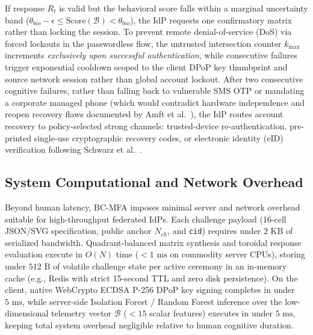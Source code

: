If response $R_t$ is valid but the behavioral score falls within a marginal uncertainty band ($\theta_{bio} - \epsilon \le \text{Score}(\mathcal{B}) < \theta_{bio}$), the IdP requests one confirmatory matrix rather than locking the session. To prevent remote denial-of-service (DoS) via forced lockouts in the passwordless flow, the untrusted intersection counter $k_{\max}$ increments \emph{exclusively upon successful authentication}, while consecutive failures trigger exponential cooldown scoped to the client DPoP key thumbprint and source network session rather than global account lockout. After two consecutive cognitive failures, rather than falling back to vulnerable SMS OTP or mandating a corporate managed phone (which would contradict hardware independence and reopen recovery flaws documented by Amft et al.~\cite{amft2023weve}), the IdP routes account recovery to policy-selected strong channels: trusted-device re-authentication, pre-printed single-use cryptographic recovery codes, or electronic identity (eID) verification following Schwarz et al.~\cite{schwarz2022feido}.

\subsection{System Computational and Network Overhead}
Beyond human latency, BC-MFA imposes minimal server and network overhead suitable for high-throughput federated IdPs. Each challenge payload (16-cell JSON/SVG specification, public anchor $N_{ch}$, and \texttt{cid}) requires under $2\text{ KB}$ of serialized bandwidth. Quadrant-balanced matrix synthesis and toroidal response evaluation execute in $O(N)$ time ($< 1\text{ ms}$ on commodity server CPUs), storing under $512\text{ B}$ of volatile challenge state per active ceremony in an in-memory cache (e.g., Redis with strict 15-second TTL and zero disk persistence). On the client, native WebCrypto ECDSA P-256 DPoP key signing completes in under $5\text{ ms}$, while server-side Isolation Forest / Random Forest inference over the low-dimensional telemetry vector $\mathcal{B}$ ($< 15$ scalar features) executes in under $5\text{ ms}$, keeping total system overhead negligible relative to human cognitive duration.

